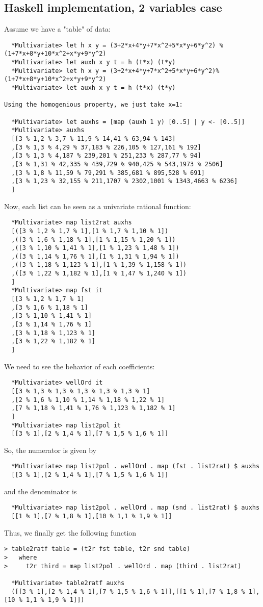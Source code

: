 \documentclass[11pt]{book}
\begin{document}
\subsection{Haskell implementation, 2 variables case}
Assume we have a "table" of data:
\begin{verbatim}
  *Multivariate> let h x y = (3+2*x+4*y+7*x^2+5*x*y+6*y^2) % (1+7*x+8*y+10*x^2+x*y+9*y^2)
  *Multivariate> let auxh x y t = h (t*x) (t*y)
  *Multivariate> let h x y = (3+2*x+4*y+7*x^2+5*x*y+6*y^2)% (1+7*x+8*y+10*x^2+x*y+9*y^2)
  *Multivariate> let auxh x y t = h (t*x) (t*y)

Using the homogenious property, we just take x=1:

  *Multivariate> let auxhs = [map (auxh 1 y) [0..5] | y <- [0..5]]
  *Multivariate> auxhs
  [[3 % 1,2 % 3,7 % 11,9 % 14,41 % 63,94 % 143]
  ,[3 % 1,3 % 4,29 % 37,183 % 226,105 % 127,161 % 192]
  ,[3 % 1,3 % 4,187 % 239,201 % 251,233 % 287,77 % 94]
  ,[3 % 1,31 % 42,335 % 439,729 % 940,425 % 543,1973 % 2506]
  ,[3 % 1,8 % 11,59 % 79,291 % 385,681 % 895,528 % 691]
  ,[3 % 1,23 % 32,155 % 211,1707 % 2302,1001 % 1343,4663 % 6236]
  ]
\end{verbatim}
Now, each list can be seen as a univariate rational function:  
\begin{verbatim}  
  *Multivariate> map list2rat auxhs
  [([3 % 1,2 % 1,7 % 1],[1 % 1,7 % 1,10 % 1])
  ,([3 % 1,6 % 1,18 % 1],[1 % 1,15 % 1,20 % 1])
  ,([3 % 1,10 % 1,41 % 1],[1 % 1,23 % 1,48 % 1])
  ,([3 % 1,14 % 1,76 % 1],[1 % 1,31 % 1,94 % 1])
  ,([3 % 1,18 % 1,123 % 1],[1 % 1,39 % 1,158 % 1])
  ,([3 % 1,22 % 1,182 % 1],[1 % 1,47 % 1,240 % 1])
  ]
  *Multivariate> map fst it
  [[3 % 1,2 % 1,7 % 1]
  ,[3 % 1,6 % 1,18 % 1]
  ,[3 % 1,10 % 1,41 % 1]
  ,[3 % 1,14 % 1,76 % 1]
  ,[3 % 1,18 % 1,123 % 1]
  ,[3 % 1,22 % 1,182 % 1]
  ]
\end{verbatim}
We need to see the behavior of each coefficients:
\begin{verbatim}  
  *Multivariate> wellOrd it
  [[3 % 1,3 % 1,3 % 1,3 % 1,3 % 1,3 % 1]
  ,[2 % 1,6 % 1,10 % 1,14 % 1,18 % 1,22 % 1]
  ,[7 % 1,18 % 1,41 % 1,76 % 1,123 % 1,182 % 1]
  ]
  *Multivariate> map list2pol it
  [[3 % 1],[2 % 1,4 % 1],[7 % 1,5 % 1,6 % 1]]
\end{verbatim}  
So, the numerator is given by
\begin{verbatim}  
  *Multivariate> map list2pol . wellOrd . map (fst . list2rat) $ auxhs
  [[3 % 1],[2 % 1,4 % 1],[7 % 1,5 % 1,6 % 1]]
\end{verbatim}    
and the denominator is
\begin{verbatim}  
  *Multivariate> map list2pol . wellOrd . map (snd . list2rat) $ auxhs
  [[1 % 1],[7 % 1,8 % 1],[10 % 1,1 % 1,9 % 1]]
\end{verbatim}
Thus, we finally get the following function
\begin{verbatim}
> table2ratf table = (t2r fst table, t2r snd table)
>   where
>     t2r third = map list2pol . wellOrd . map (third . list2rat)
  
  *Multivariate> table2ratf auxhs
  ([[3 % 1],[2 % 1,4 % 1],[7 % 1,5 % 1,6 % 1]],[[1 % 1],[7 % 1,8 % 1],[10 % 1,1 % 1,9 % 1]])
\end{verbatim}
\end{document}
